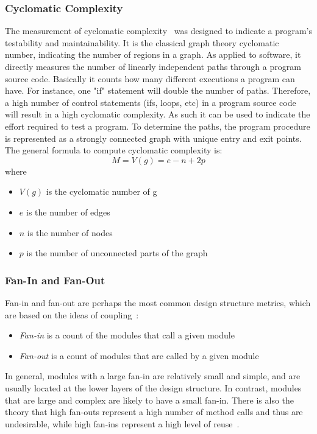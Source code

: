 \subsubsection{Cyclomatic Complexity}
The measurement of cyclomatic complexity~\cite{mccabe1976complexity} was designed to indicate a program's testability and maintainability.
It is the classical graph theory cyclomatic number, indicating the number of regions in a graph.
As applied to software, it directly measures the number of linearly independent paths through a program source code.
Basically it counts how many different executions a program can have. 
For instance, one "if" statement will double the number of paths. 
Therefore, a high number of control statements (ifs, loops, etc) in a program source code will result in a high cyclomatic complexity. 
As such it can be used to indicate the effort required to test a program. To determine the paths, the program procedure is represented as a strongly connected graph with unique entry and exit points. The general formula to compute cyclomatic complexity is: 
$$M = V(g) = e - n + 2p$$
where
\begin{itemize}
\item \emph{$V(g)$} is the cyclomatic number of g 
\item \emph{$e$   } is the number of edges 
\item \emph{$n$   } is the number of nodes 
\item \emph{$p$   } is the number of unconnected parts of the graph 
\end{itemize}


\subsubsection{Fan-In and Fan-Out}
Fan-in and fan-out are perhaps the most common design structure metrics, which are based on the ideas of coupling~\cite{yourdon1979structured}:
\begin{itemize}
\item \emph{Fan-in } is a count of the modules that call a given module
\item \emph{Fan-out} is a count of modules that are called by a given module
\end{itemize}

In general, modules with a large fan-in are relatively small and simple, and are usually located at the lower layers of the design structure.
In contrast, modules that are large and complex are likely to have a small fan-in.
There is also the theory that high fan-outs represent a high number of method calls and thus are undesirable,
while high fan-ins represent a high level of reuse~\cite{wang2007dynamic}.

